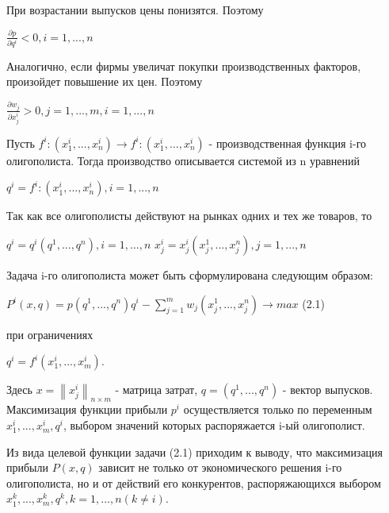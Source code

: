 \documentclass[12pt, 4paper]{book}
\begin{document}
{При возрастании выпусков цены понизятся. Поэтому
\begin{center}
$\frac{\partial p}{\partial q^i} < 0, i=1,...,n$
\end{center}
\par

Аналогично, если фирмы увеличат покупки производственных факторов, произойдет повышение их цен. Поэтому
\begin{center}
$\frac{\partial w_j}{\partial x_{j}^{i}}>0 ,j=1,...,m,i=1,...,n$
\end{center}
\par

Пусть $f^{i}:(x_{1}^i,...,x_{n}^i) \rightarrow f^{i}:(x_{1}^i,...,x_{n}^i)$  - производственная функция i-го олигополиста. Тогда производство описывается системой из n уравнений
\begin{center}
$q^i = f^{i}:(x_{1}^i,...,x_{n}^i),i=1,...,n$
\end{center}
Так как все олигополисты действуют на рынках одних и тех же товаров, то
\begin{center}
$q^i=q^i(q^1,...,q^n), i=1,...,n$
$x_{j}^{i} = x_{j}^i(x_{j}^1,...,x_{j}^n), j=1,...,n$
\end{center}
\par

Задача i-го олигополиста может быть сформулирована следующим образом:
\begin{center}
$P^{i}(x,q)=p(q^1,...,q^n)q^i - \sum\limits_{j=1}^m w_j(x_{j}^1,...,x_{j}^n) \rightarrow max$ (2.1)
\end{center}
\begin{center}
при ограничениях
\end{center}
\begin{center}
$q^i=f^i(x_{1}^i,...,x_{m}^i).$
\end{center}
\par

Здесь $x = \left\|x_{j}^{i}\right\|_{n \times m}$ - матрица затрат, $q=(q^1,...,q^n)$ - вектор выпусков. Максимизация функции  прибыли $p^i$ осуществляется только по переменным $x_{1}^{i},...,x_{m}^i, q^i $, выбором значений которых распоряжается i-ый олигополист.
\par

Из вида целевой функции задачи (2.1) приходим к выводу, что максимизация прибыли $P(x,q)$ зависит не только от экономического решения i-го олигополиста, но и от действий его конкурентов, распоряжающихся выбором $x_{1}^{k},...,x_{m}^k, q^k , k=1,...,n (k \neq i)$.
\par

}
\end{document}
